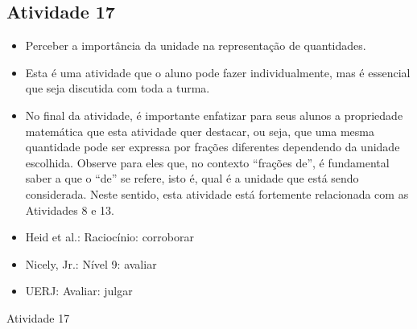 \begin{multicols}{2}
\subsection{Atividade 17}



  \vspace{.1cm}

\begin{itemize} %
    \item       Perceber a importância da unidade na representação de quantidades.
\end{itemize} %



  \vspace{.1cm}

  \vspace{.1cm}

\begin{itemize} %
    \item       Esta é uma atividade que o aluno pode fazer individualmente, mas é essencial que seja discutida com toda a turma.
    \item       No final da atividade, é importante enfatizar para seus alunos a propriedade matemática que esta atividade quer destacar, ou seja, que uma mesma quantidade pode ser expressa por frações diferentes dependendo da unidade escolhida. Observe para eles que, no contexto       ``frações de'', é fundamental saber a que o       ``de''     se refere, isto é, qual é a unidade que está sendo considerada. Neste sentido, esta atividade está fortemente relacionada com as Atividades 8 e 13.
\end{itemize} %


  \vspace{.1cm}

 \vspace{.1cm}
\begin{itemize} %
    \item       Heid et al.: Raciocínio: corroborar
    \item       Nicely, Jr.: Nível 9: avaliar
    \item       UERJ: Avaliar: julgar
\end{itemize} %


\begin{resposta*}{Atividade 17}


\end{resposta*}
\end{multicols}
